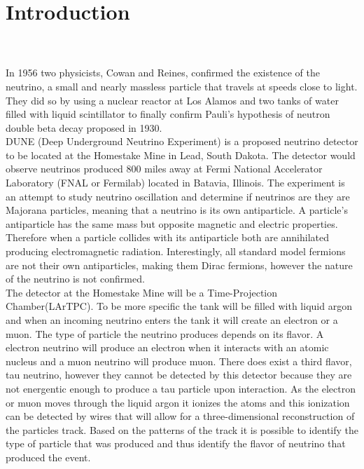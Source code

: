 \documentclass[svgnames]{report}
\begin{document}
    \section*{Introduction}
         \\ \\
\indent In 1956 two physicists, Cowan and Reines, confirmed the existence of the neutrino, a small and nearly massless particle that travels at speeds close to light. They did so by using a nuclear reactor at Los Alamos and two tanks of water filled with liquid scintillator to finally confirm Pauli's hypothesis of neutron double beta decay proposed in 1930.\\
\indent DUNE (Deep Underground Neutrino Experiment) is a proposed neutrino detector to be located at the Homestake Mine in Lead, South Dakota. The detector would observe neutrinos produced 800 miles away at Fermi National Accelerator Laboratory (FNAL or Fermilab) located in Batavia, Illinois. The experiment is an attempt to study neutrino oscillation and determine if neutrinos are they are Majorana particles, meaning that a neutrino is its own antiparticle. A particle's antiparticle has the same mass but opposite magnetic and electric properties. Therefore when a particle collides with its antiparticle both are annihilated producing electromagnetic radiation. Interestingly, all standard model fermions are not their own antiparticles, making them Dirac fermions, however the nature of the neutrino is not confirmed. \\ 
\indent The detector at the Homestake Mine will be a Time-Projection Chamber(LArTPC). To be more specific the tank will be filled with liquid argon and when an incoming neutrino enters the tank it will create an electron or a muon. The type of particle the neutrino produces depends on its flavor. A electron neutrino will produce an electron when it interacts with an atomic nucleus and a muon neutrino will produce muon. There does exist a third flavor, tau neutrino, however they cannot be detected by this detector because they are not energentic enough to produce a tau particle upon interaction.  As the electron or muon moves through the liquid argon it ionizes the atoms and this ionization can be detected by wires that will allow for a three-dimensional reconstruction of the particles track. Based on the patterns of the track it is possible to identify the type of particle that was produced and thus identify the flavor of neutrino that produced the event.
\end{document}
